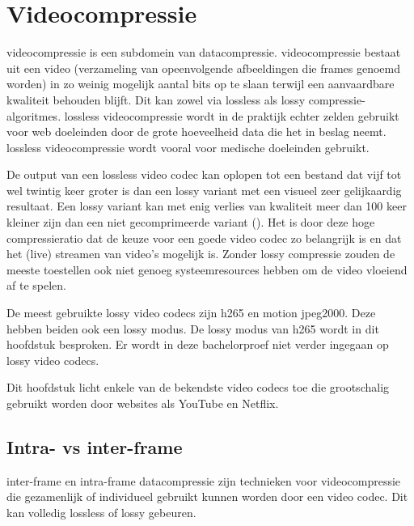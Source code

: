 \chapter{Videocompressie}
\label{ch:videocompressie}

\Gls{videocompressie} is een subdomein van \gls{datacompressie}. \Gls{videocompressie} bestaat uit een video (verzameling van opeenvolgende afbeeldingen die frames genoemd worden) in zo weinig mogelijk aantal \glspl{bit} op te slaan terwijl een aanvaardbare kwaliteit behouden blijft. Dit kan zowel via \gls{lossless} als \gls{lossy} \glspl{compressie-algoritme}. \Gls{lossless} \gls{videocompressie} wordt in de praktijk echter zelden gebruikt voor web doeleinden door de grote hoeveelheid data die het in beslag neemt. \Gls{lossless} \gls{videocompressie} wordt vooral voor medische doeleinden gebruikt.

De output van een \gls{lossless} video \gls{codec} kan oplopen tot een bestand dat vijf tot wel twintig keer groter is dan een \gls{lossy} variant met een visueel zeer gelijkaardig resultaat. Een \gls{lossy} variant kan met enig verlies van kwaliteit meer dan 100 keer kleiner zijn dan een niet gecomprimeerde variant (\cite{importancelossyvidecodecs}). Het is door deze hoge \gls{compressieratio} dat de keuze voor een goede video \gls{codec} zo belangrijk is en dat het (live) streamen van video's mogelijk is. Zonder \gls{lossy} compressie zouden de meeste toestellen ook niet genoeg systeemresources hebben om de video vloeiend af te spelen.

De meest gebruikte \gls{lossy} video \glspl{codec} zijn \gls{h265} en motion \gls{jpeg2000}. Deze hebben beiden ook een \gls{lossy} modus. De \gls{lossy} modus van \gls{h265} wordt in dit hoofdstuk besproken. Er wordt in deze bachelorproef niet verder ingegaan op \gls{lossy} video \glspl{codec}.

Dit hoofdstuk licht enkele van de bekendste video \glspl{codec} toe die grootschalig gebruikt worden door websites als YouTube en Netflix.

\section{Intra- vs inter-frame}
\label{sec:videocompressie-intra-inter}

\Gls{inter-frame} en \gls{intra-frame} \gls{datacompressie} zijn technieken voor \gls{videocompressie} die gezamenlijk of individueel gebruikt kunnen worden door een video \gls{codec}. Dit kan volledig \gls{lossless} of \gls{lossy} gebeuren.

